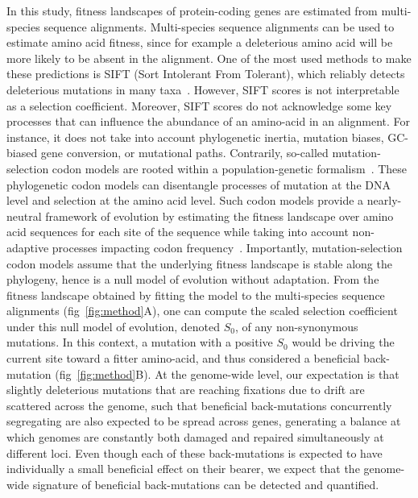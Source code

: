 \documentclass{article}
\newcommand{\Sphy}{S_{0}}
\begin{document}
    In this study, fitness landscapes of protein-coding genes are estimated from multi-species sequence alignments.
    Multi-species sequence alignments can be used to estimate amino acid fitness, since for example a deleterious amino acid will be more likely to be absent in the alignment.
    One of the most used methods to make these predictions is SIFT (Sort Intolerant From Tolerant), which reliably detects deleterious mutations in many taxa~\cite{ng_sift_2003, vaser_sift_2016}.
    However, SIFT scores is not interpretable as a selection coefficient.
    Moreover, SIFT scores do not acknowledge some key processes that can influence the abundance of an amino-acid in an alignment. For instance, it does not take into account phylogenetic inertia, mutation biases, GC-biased gene conversion, or mutational paths.
    Contrarily, so-called mutation-selection codon models are rooted within a population-genetic formalism~\cite{halpern_evolutionary_1998, mccandlish_modeling_2014}.
    These phylogenetic codon models can disentangle processes of mutation at the DNA level and selection at the amino acid level.
    Such codon models provide a nearly-neutral framework of evolution by estimating the fitness landscape over amino acid sequences for each site of the sequence while taking into account non-adaptive processes impacting codon frequency~\cite{halpern_evolutionary_1998, rodrigue_mechanistic_2010, tamuri_estimating_2012, latrille_improved_2022a}.
    Importantly, mutation-selection codon models assume that the underlying fitness landscape is stable along the phylogeny, hence is a null model of evolution without adaptation.
    From the fitness landscape obtained by fitting the model to the multi-species sequence alignments (fig~\ref{fig:method}A), one can compute the scaled selection coefficient under this null model of evolution, denoted $\Sphy$, of any non-synonymous mutations.
    In this context, a mutation with a positive $\Sphy$ would be driving the current site toward a fitter amino-acid, and thus considered a beneficial back-mutation (fig~\ref{fig:method}B).
    At the genome-wide level, our expectation is that slightly deleterious mutations that are reaching fixations due to drift are scattered across the genome, such that beneficial back-mutations concurrently segregating are also expected to be spread across genes, generating a balance at which genomes are constantly both damaged and repaired simultaneously at different loci.
    Even though each of these back-mutations is expected to have individually a small beneficial effect on their bearer, we expect that the genome-wide signature of beneficial back-mutations can be detected and quantified.
\end{document}
